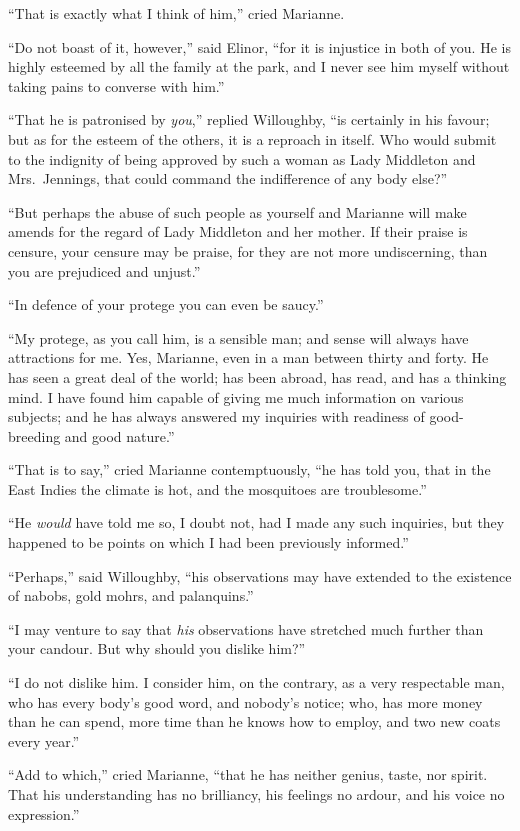 \documentclass{article}
\begin{document}
``That is exactly what I think of him,'' cried Marianne.

``Do not boast of it, however,'' said Elinor, ``for it
is injustice in both of you.  He is highly esteemed
by all the family at the park, and I never see him myself
without taking pains to converse with him.''

``That he is patronised by \emph{you},'' replied Willoughby,
``is certainly in his favour; but as for the esteem
of the others, it is a reproach in itself.  Who would
submit to the indignity of being approved by such a woman
as Lady Middleton and Mrs.\ Jennings, that could command
the indifference of any body else?''

``But perhaps the abuse of such people as yourself
and Marianne will make amends for the regard of Lady
Middleton and her mother.  If their praise is censure,
your censure may be praise, for they are not more undiscerning,
than you are prejudiced and unjust.''

``In defence of your protege you can even be saucy.''

``My protege, as you call him, is a sensible man;
and sense will always have attractions for me.
Yes, Marianne, even in a man between thirty and forty.
He has seen a great deal of the world; has been abroad,
has read, and has a thinking mind.  I have found him
capable of giving me much information on various subjects;
and he has always answered my inquiries with readiness of
good-breeding and good nature.''

``That is to say,'' cried Marianne contemptuously,
``he has told you, that in the East Indies the climate is hot,
and the mosquitoes are troublesome.''

``He \emph{would} have told me so, I doubt not, had I made
any such inquiries, but they happened to be points
on which I had been previously informed.''

``Perhaps,'' said Willoughby, ``his observations may
have extended to the existence of nabobs, gold mohrs,
and palanquins.''

``I may venture to say that \emph{his} observations
have stretched much further than your candour.
But why should you dislike him?''

``I do not dislike him.  I consider him, on the contrary,
as a very respectable man, who has every body's good word,
and nobody's notice; who, has more money than he can spend,
more time than he knows how to employ, and two new coats
every year.''

``Add to which,'' cried Marianne, ``that he has
neither genius, taste, nor spirit.  That his understanding
has no brilliancy, his feelings no ardour, and his voice
no expression.''
\end{document}
